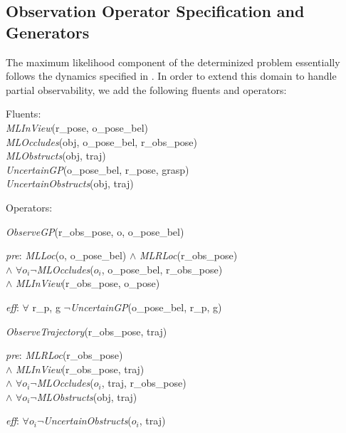 \subsection{Observation Operator Specification and Generators}
The maximum likelihood component of the determinized problem
essentially follows the dynamics specified in
. In order to extend this domain to handle
partial observability, we add the following fluents and operators:
\begin{tightlist}
  \item[]Fluents: \\\emph{MLInView}(r\_pose, o\_pose\_bel)\\
    \emph{MLOccludes}(obj, o\_pose\_bel, r\_obs\_pose)\\
    \emph{MLObstructs}(obj, traj)\\
    \emph{UncertainGP}(o\_pose\_bel, r\_pose, grasp)\\
    \emph{UncertainObstructs}(obj, traj)
  \item[]Operators:
  \begin{tightlist} \item \emph{ObserveGP}(r\_obs\_pose, o, o\_pose\_bel)
\begin{tightlist}
  \item[\emph{pre}:] \emph{MLLoc}(o, o\_pose\_bel) $\wedge$
    \emph{MLRLoc}(r\_obs\_pose) \\$\wedge$ $\forall o_i
    \lnot$\emph{MLOccludes}($o_i$, o\_pose\_bel, r\_obs\_pose) \\ $\wedge$
    \emph{MLInView}(r\_obs\_pose, o\_pose)
  \item[\emph{eff}:] $\forall$ r\_p, g $\lnot$\emph{UncertainGP}(o\_pose\_bel, r\_p, g)
\end{tightlist}
\item  \emph{ObserveTrajectory}(r\_obs\_pose, traj) 

\begin{tightlist}
  \item[\emph{pre}:] \emph{MLRLoc}(r\_obs\_pose) \\$\wedge$
    \emph{MLInView}(r\_obs\_pose, traj)\\ $\wedge$
    $\forall o_i \lnot$\emph{MLOccludes}($o_i$, traj, r\_obs\_pose)\\ $\wedge$
    $\forall o_i \lnot$\emph{MLObstructs}(obj, traj)
  \item[\emph{eff}:] $\forall o_i \lnot$\emph{UncertainObstructs}($o_i$,
    traj)
\end{tightlist}
\end{tightlist}
\end{tightlist}

